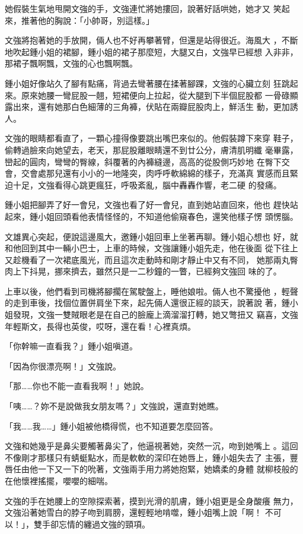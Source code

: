 她假裝生氣地甩開文強的手，文強連忙將她摟回，說著好話哄她，她才又
笑起來，推著他的胸說：「小帥哥，別這樣。」

文強將抱著她的手放開，倆人也不好再攀著臂，但還是站得很近。海風大
，不斷地吹起鍾小姐的裙腳，鍾小姐的裙子那麼短，大腿又白，文強早已經想
入非非，那裙子飄啊飄，文強的心也飄啊飄。

鍾小姐好像站久了腳有點痛，背過去彎著腰在揉著腳踝，文強的心臟立刻
狂跳起來。原來她腰一彎屁股一翹，短裙便向上拉起，從大腿到下半個屁股都
一骨碌顯露出來，還有她那白色細薄的三角褲，伏貼在兩瓣屁股肉上，鮮活生
動，更加誘人。

文強的眼睛都看直了，一顆心撞得像要跳出嘴巴來似的。他假裝蹲下來穿
鞋子，偷轉過臉來向她望去，老天，那屁股離眼睛還不到廿公分，膚清肌明纖
毫畢露，巒起的圓肉，彎彎的臀線，斜覆著的內褲縫邊，高高的從股側巧妙地
在臀下交會，交會處那兒還有小小的一地隆突，肉呼呼軟綿綿的樣子，充滿真
實感而且緊迫十足，文強看得心跳更瘋狂，呼吸紊亂，腦中轟轟作響，老二硬
的發痛。

鍾小姐把腳弄了好一會兒，文強也看了好一會兒，直到她站直回來，他也
趕快站起來，鍾小姐回頭看他表情怪怪的，不知道他偷窺春色，還笑他樣子愣
頭愣腦。

文雄異心突起，便說這邊風大，邀鍾小姐回車上坐著再聊。鍾小姐心想也
好，就和他回到其中一輛小巴士，上車的時候，文強讓鍾小姐先走，他在後面
從下往上又趁機看了一次裙底風光，而且這次走動時和剛才靜止中又有不同，
她那兩丸臀肉上下抖晃，挪來擠去，雖然只是一二秒鐘的一瞥，已經夠文強回
味的了。

上車以後，他們看到司機將腳擱在駕駛盤上，睡他娘啦。倆人也不驚擾他
，輕聲的走到車後，找個位置併肩坐下來，起先倆人還很正經的談天，說著說
著，鍾小姐發現，文強一雙賊眼老是在自己的臉龐上滴溜溜打轉，她又彆扭又
竊喜，文強年輕斯文，長得也英俊，哎呀，還在看！心裡真煩。

「你幹嘛一直看我？」鍾小姐嗔道。

「因為你很漂亮啊！」文強說。

「那……你也不能一直看我啊！」她說。

「咦……？妳不是說做我女朋友嗎？」文強說，還直對她瞧。

「我……我……」鍾小姐被他橋得慌，也不知道要怎麼回答。

文強和她幾乎是鼻尖要觸著鼻尖了，他逼視著她，突然一沉，吻到她嘴上
。這回不像剛才那樣只有蜻蜓點水，而是軟軟的深印在她唇上，鍾小姐失去了
主張，豐唇任由他一下又一下的吮著，文強兩手用力將她抱緊，她嬌柔的身體
就柳枝般的在他懷裡搖擺，嚶嚶的細喘。

文強的手在她腰上的空隙探索著，摸到光滑的肌膚，鍾小姐更是全身酸癢
無力，文強沿著她雪白的脖子吻到肩膀，還輕輕地啃噬，鍾小姐嘴上說「啊！
不可以！」，雙手卻忘情的纏過文強的頸項。

